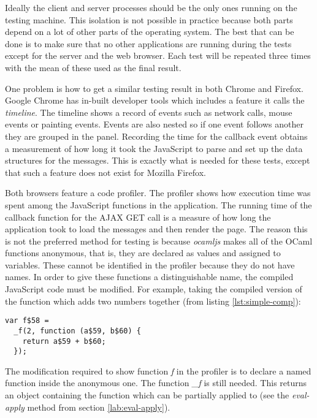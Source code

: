 Ideally the client and server processes should be the only ones running on the testing machine. This isolation is not possible in practice because both parts depend on a lot of other parts of the operating system. The best that can be done is to make sure that no other applications are running during the tests except for the server and the web browser. Each test will be repeated three times with the mean of these used as the final result.

One problem is how to get a similar testing result in both Chrome and Firefox. Google Chrome has in-built developer tools which includes a feature it calls the \emph{timeline}. The timeline shows a record of events such as network calls, mouse events or painting events. Events are also nested so if one event follows another they are grouped in the panel. Recording the time for the callback event obtains a measurement of how long it took the JavaScript to parse and set up the data structures for the messages. This is exactly what is needed for these tests, except that such a feature does not exist for Mozilla Firefox.

Both browsers feature a code profiler. The profiler shows how execution time was spent among the JavaScript functions in the application. The running time of the callback function for the AJAX GET call is a measure of how long the application took to load the messages and then render the page. The reason this is not the preferred method for testing is because \emph{ocamljs} makes all of the OCaml functions anonymous, that is, they are declared as values and assigned to variables. These cannot be identified in the profiler because they do not have names. In order to give these functions a distinguishable name, the compiled JavaScript code must be modified. For example, taking the compiled version of the function which adds two numbers together (from listing \ref{lst:simple-comp}):

\begin{lstlisting}[caption={Compiled JavaScript example}]
var f$58 =
  _f(2, function (a$59, b$60) {
    return a$59 + b$60;
  });
\end{lstlisting}

The modification required to show function \emph{f} in the profiler is to declare a named function inside the anonymous one. The function \emph{\_f} is still needed. This returns an object containing the function which can be partially applied to (see the \emph{eval-apply} method from section \ref{lab:eval-apply}).

